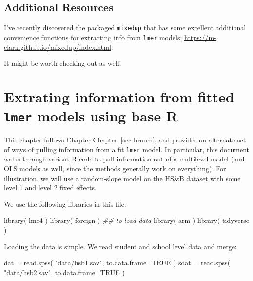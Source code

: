 \documentclass[
  letterpaper,
  DIV=11,
  numbers=noendperiod]{scrreprt}
\newenvironment{Shaded}{}{}
\newcommand{\AttributeTok}[1]{\textcolor[rgb]{0.49,0.56,0.16}{#1}}
\newcommand{\ConstantTok}[1]{\textcolor[rgb]{0.53,0.00,0.00}{#1}}
\newcommand{\DocumentationTok}[1]{\textcolor[rgb]{0.73,0.13,0.13}{\textit{#1}}}
\newcommand{\FunctionTok}[1]{\textcolor[rgb]{0.02,0.16,0.49}{#1}}
\newcommand{\NormalTok}[1]{#1}
\newcommand{\OtherTok}[1]{\textcolor[rgb]{0.00,0.44,0.13}{#1}}
\newcommand{\StringTok}[1]{\textcolor[rgb]{0.25,0.44,0.63}{#1}}
\begin{document}
\section{Additional Resources}\label{additional-resources}

I've recently discovered the packaged \texttt{mixedup} that has some
excellent additional convenience functions for extracting info from
\texttt{lmer} models:
\url{https://m-clark.github.io/mixedup/index.html}.

It might be worth checking out as well!

\chapter{\texorpdfstring{Extrating information from fitted \texttt{lmer}
models using base
R}{Extrating information from fitted lmer models using base R}}\label{extrating-information-from-fitted-lmer-models-using-base-r}

This chapter follows Chapter Chapter~\ref{sec-broom}, and provides an
alternate set of ways of pulling information from a fit \texttt{lmer}
model. In particular, this document walks through various R code to pull
information out of a multilevel model (and OLS models as well, since the
methods generally work on everything). For illustration, we will use a
random-slope model on the HS\&B dataset with some level 1 and level 2
fixed effects.

We use the following libraries in this file:

\begin{Shaded}
\begin{Highlighting}[]
\FunctionTok{library}\NormalTok{( lme4 )}
\FunctionTok{library}\NormalTok{( foreign ) }\DocumentationTok{\#\# to load data}
\FunctionTok{library}\NormalTok{( arm )}
\FunctionTok{library}\NormalTok{( tidyverse )}
\end{Highlighting}
\end{Shaded}

Loading the data is simple. We read student and school level data and
merge:

\begin{Shaded}
\begin{Highlighting}[]
\NormalTok{dat }\OtherTok{=} \FunctionTok{read.spss}\NormalTok{( }\StringTok{"data/hsb1.sav"}\NormalTok{, }\AttributeTok{to.data.frame=}\ConstantTok{TRUE}\NormalTok{ )}
\NormalTok{sdat }\OtherTok{=} \FunctionTok{read.spss}\NormalTok{( }\StringTok{"data/hsb2.sav"}\NormalTok{, }\AttributeTok{to.data.frame=}\ConstantTok{TRUE}\NormalTok{ )}
\end{Highlighting}
\end{Shaded}
\end{document}

